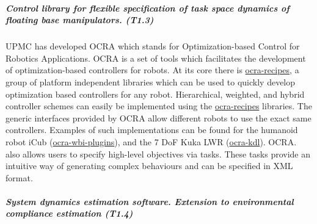 \subparagraph{Control library for flexible specification of task space
  dynamics of floating base manipulators. (T1.3)}


UPMC has developed OCRA which stands for Optimization-based Control for Robotics Applications. OCRA is a set of tools which facilitates the development of optimization-based controllers for robots. At its core there is \href{https://github.com/ocra-recipes/ocra-recipes}{ocra-recipes}, a group of platform independent libraries which can be used to quickly develop optimization based controllers for any robot. Hierarchical, weighted, and hybrid controller schemes can easily be implemented using the \href{https://github.com/ocra-recipes/ocra-recipes}{ocra-recipes} libraries. The generic interfaces provided by OCRA allow different robots to use the exact same controllers. Examples of such implementations can be found for the humanoid robot iCub (\href{https://github.com/ocra-recipes/ocra-wbi-plugins}{ocra-wbi-plugins}), and the 7 DoF Kuka LWR (\href{https://github.com/kuka-isir/ocra-kdl}{ocra-kdl}). OCRA. also allows users to specify high-level objectives via tasks. These tasks provide an intuitive way of generating complex behaviours and can be specified in XML format.



\subparagraph{System dynamics estimation software. Extension to
environmental compliance estimation (T1.4)}

